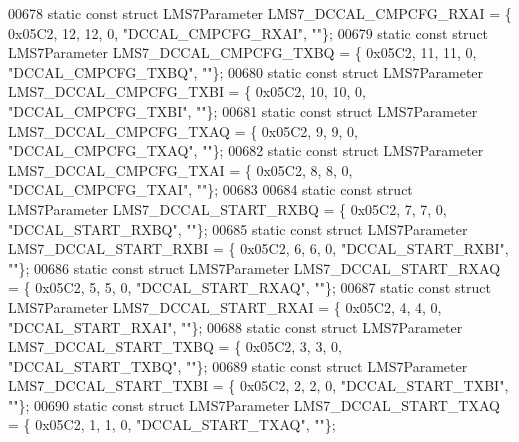 \begin{DoxyCode}
00678 \textcolor{keyword}{static} \textcolor{keyword}{const} \textcolor{keyword}{struct }LMS7Parameter LMS7_DCCAL_CMPCFG_RXAI = \{ 0x05C2, 12, 12, 0, \textcolor{stringliteral}{"DCCAL\_CMPCFG\_RXAI"}, \textcolor{stringliteral}{""}\};
00679 \textcolor{keyword}{static} \textcolor{keyword}{const} \textcolor{keyword}{struct }LMS7Parameter LMS7_DCCAL_CMPCFG_TXBQ = \{ 0x05C2, 11, 11, 0, \textcolor{stringliteral}{"DCCAL\_CMPCFG\_TXBQ"}, \textcolor{stringliteral}{""}\};
00680 \textcolor{keyword}{static} \textcolor{keyword}{const} \textcolor{keyword}{struct }LMS7Parameter LMS7_DCCAL_CMPCFG_TXBI = \{ 0x05C2, 10, 10, 0, \textcolor{stringliteral}{"DCCAL\_CMPCFG\_TXBI"}, \textcolor{stringliteral}{""}\};
00681 \textcolor{keyword}{static} \textcolor{keyword}{const} \textcolor{keyword}{struct }LMS7Parameter LMS7_DCCAL_CMPCFG_TXAQ = \{ 0x05C2, 9, 9, 0, \textcolor{stringliteral}{"DCCAL\_CMPCFG\_TXAQ"}, \textcolor{stringliteral}{""}\};
00682 \textcolor{keyword}{static} \textcolor{keyword}{const} \textcolor{keyword}{struct }LMS7Parameter LMS7_DCCAL_CMPCFG_TXAI = \{ 0x05C2, 8, 8, 0, \textcolor{stringliteral}{"DCCAL\_CMPCFG\_TXAI"}, \textcolor{stringliteral}{""}\};
00683 
00684 \textcolor{keyword}{static} \textcolor{keyword}{const} \textcolor{keyword}{struct }LMS7Parameter LMS7_DCCAL_START_RXBQ = \{ 0x05C2, 7, 7, 0, \textcolor{stringliteral}{"DCCAL\_START\_RXBQ"}, \textcolor{stringliteral}{""}\};
00685 \textcolor{keyword}{static} \textcolor{keyword}{const} \textcolor{keyword}{struct }LMS7Parameter LMS7_DCCAL_START_RXBI = \{ 0x05C2, 6, 6, 0, \textcolor{stringliteral}{"DCCAL\_START\_RXBI"}, \textcolor{stringliteral}{""}\};
00686 \textcolor{keyword}{static} \textcolor{keyword}{const} \textcolor{keyword}{struct }LMS7Parameter LMS7_DCCAL_START_RXAQ = \{ 0x05C2, 5, 5, 0, \textcolor{stringliteral}{"DCCAL\_START\_RXAQ"}, \textcolor{stringliteral}{""}\};
00687 \textcolor{keyword}{static} \textcolor{keyword}{const} \textcolor{keyword}{struct }LMS7Parameter LMS7_DCCAL_START_RXAI = \{ 0x05C2, 4, 4, 0, \textcolor{stringliteral}{"DCCAL\_START\_RXAI"}, \textcolor{stringliteral}{""}\};
00688 \textcolor{keyword}{static} \textcolor{keyword}{const} \textcolor{keyword}{struct }LMS7Parameter LMS7_DCCAL_START_TXBQ = \{ 0x05C2, 3, 3, 0, \textcolor{stringliteral}{"DCCAL\_START\_TXBQ"}, \textcolor{stringliteral}{""}\};
00689 \textcolor{keyword}{static} \textcolor{keyword}{const} \textcolor{keyword}{struct }LMS7Parameter LMS7_DCCAL_START_TXBI = \{ 0x05C2, 2, 2, 0, \textcolor{stringliteral}{"DCCAL\_START\_TXBI"}, \textcolor{stringliteral}{""}\};
00690 \textcolor{keyword}{static} \textcolor{keyword}{const} \textcolor{keyword}{struct }LMS7Parameter LMS7_DCCAL_START_TXAQ = \{ 0x05C2, 1, 1, 0, \textcolor{stringliteral}{"DCCAL\_START\_TXAQ"}, \textcolor{stringliteral}{""}\};

\end{DoxyCode}
